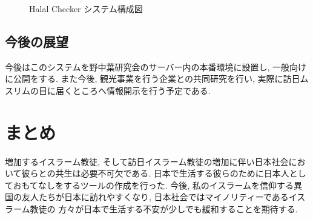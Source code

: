 \begin{figure}[htbp]
    \begin{center}
    \end{center}
    \caption{Halal Checker システム構成図}
    \label{fig:halal_checker_system}
\end{figure}

\subsection{今後の展望}
今後はこのシステムを野中葉研究会のサーバー内の本番環境に設置し, 一般向けに公開をする.
また今後, 観光事業を行う企業との共同研究を行い, 実際に訪日ムスリムの目に届くところへ情報開示を行う予定である.

\section{まとめ}
増加するイスラーム教徒, そして訪日イスラーム教徒の増加に伴い日本社会において彼らとの共生は必要不可欠である.
日本で生活する彼らのために日本人としておもてなしをするツールの作成を行った.
今後, 私のイスラームを信仰する異国の友人たちが日本に訪れやすくなり, 日本社会ではマイノリティーであるイスラーム教徒の
方々が日本で生活する不安が少しでも緩和することを期待する.

